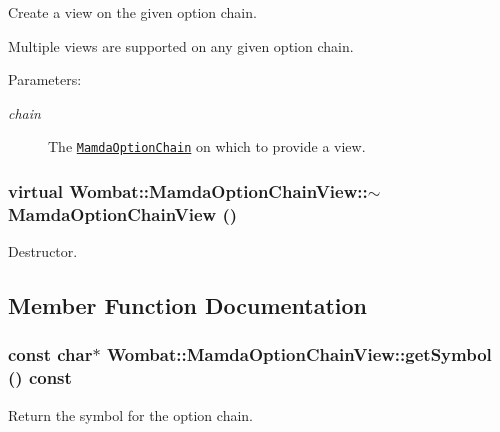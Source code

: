 Create a view on the given option chain. 

Multiple views are supported on any given option chain.

\begin{Desc}
\item[Parameters:]
\begin{description}
\item[{\em chain}]The {\tt \hyperlink{classWombat_1_1MamdaOptionChain}{Mamda\-Option\-Chain}} on which to provide a view. \end{description}
\end{Desc}
\hypertarget{classWombat_1_1MamdaOptionChainView_d21c53ec82e1d894f5dcd8ccf4c282c7}{
\subsubsection[$\sim$MamdaOptionChainView]{\setlength{\rightskip}{0pt plus 5cm}virtual Wombat::Mamda\-Option\-Chain\-View::$\sim$Mamda\-Option\-Chain\-View ()}}
\label{classWombat_1_1MamdaOptionChainView_d21c53ec82e1d894f5dcd8ccf4c282c7}


Destructor. 



\subsection{Member Function Documentation}
\hypertarget{classWombat_1_1MamdaOptionChainView_061781cf7cba60ad4c6b22a4df457511}{
\subsubsection[getSymbol]{\setlength{\rightskip}{0pt plus 5cm}const char$\ast$ Wombat::Mamda\-Option\-Chain\-View::get\-Symbol () const}}
\label{classWombat_1_1MamdaOptionChainView_061781cf7cba60ad4c6b22a4df457511}


Return the symbol for the option chain. 

